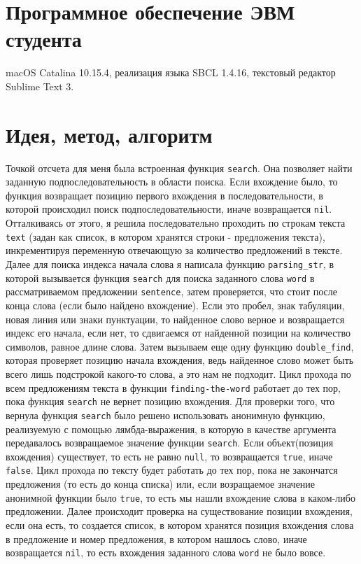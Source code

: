 \documentclass[12pt]{article}
\begin{document}
\section{Программное обеспечение ЭВМ студента}
macOS Catalina 10.15.4, реализация языка SBCL 1.4.16, текстовый редактор Sublime Text 3.

\section{Идея, метод, алгоритм}
Точкой отсчета для меня была встроенная функция {\tt search}. Она позволяет найти заданную подпоследовательность в области поиска. Если вхождение было, то функция возвращает позицию первого вхождения в последовательности, в которой происходил поиск подпоследовательности, иначе возвращается {\tt nil}.
Отталкиваясь от этого, я решила последовательно проходить по строкам текста {\tt text} (задан как список, в котором хранятся строки - предложения текста), инкрементируя переменную отвечающую за количество предложений в тексте.
Далее для поиска индекса начала слова я написала функцию {\tt parsing\_str}, в которой вызывается функция {\tt search} для поиска заданного слова {\tt word} в рассматриваемом предложении {\tt sentence}, затем проверяется, что стоит после конца слова (если было найдено вхождение).
Если это пробел, знак табуляции, новая линия или знаки пунктуации, то найденное слово верное и возвращается индекс его начала, если нет, то сдвигаемся от найденной позиции на количество символов, равное длине слова. 
Затем вызываем еще одну функцию {\tt double\_find}, которая проверяет позицию начала вхождения, ведь найденное слово может быть всего лишь подстрокой какого-то слова, а это нам не подходит. 
Цикл прохода по всем предложениям текста в функции {\tt finding-the-word} работает до тех пор, пока функция {\tt search} не вернет позицию вхождения. 
Для проверки того, что вернула функция {\tt search} было решено использовать анонимную функцию, реализуемую с помощью лямбда-выражения, в которую в качестве аргумента передавалось возвращаемое значение функции {\tt search}. 
Если объект(позиция вхождения) существует, то есть не равно {\tt null}, то возвращается {\tt true}, иначе {\tt false}. 
Цикл прохода по тексту будет работать до тех пор, пока не закончатся предложения (то есть до конца списка) или, если возращаемое значение анонимной функции было {\tt true}, то есть мы нашли вхождение слова в каком-либо предложении. 
Далее происходит проверка на существование позиции вхождения, если она есть, то создается список, в котором хранятся позиция вхождения слова в предложение и номер предложения, в котором нашлось слово, иначе возвращается {\tt nil}, то есть вхождения заданного слова {\tt word} не было вовсе.
\end{document}
